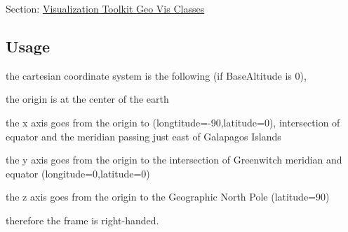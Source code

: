 Section\-: \hyperlink{sec_vtkgeovis}{Visualization Toolkit Geo Vis Classes} \hypertarget{vtkwidgets_vtkxyplotwidget_Usage}{}\subsection{Usage}\label{vtkwidgets_vtkxyplotwidget_Usage}
the cartesian coordinate system is the following (if Base\-Altitude is 0),
\begin{DoxyItemize}
\item the origin is at the center of the earth
\item the x axis goes from the origin to (longtitude=-\/90,latitude=0), intersection of equator and the meridian passing just east of Galapagos Islands
\item the y axis goes from the origin to the intersection of Greenwitch meridian and equator (longitude=0,latitude=0)
\item the z axis goes from the origin to the Geographic North Pole (latitude=90)
\item therefore the frame is right-\/handed.
\end{DoxyItemize}

